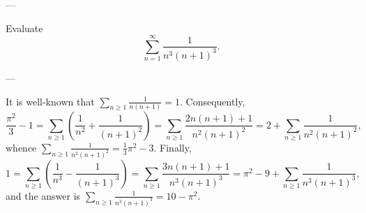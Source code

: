 
---

Evaluate \[\sum_{n=1}^\infty\frac1{n^3(n+1)^3}.\]

---

It is well-known that $\sum_{n\ge1}\frac1{n(n+1)}=1$. Consequently, \[\frac{\pi^2}3-1=\sum_{n\ge1}\left(\frac1{n^2}+\frac1{(n+1)^2}\right)=\sum_{n\ge1}\frac{2n(n+1)+1}{n^2(n+1)^2}=2+\sum_{n\ge1}\frac1{n^2(n+1)^2},\]
whence $\sum_{n\ge1}\frac1{n^2(n+1)^2}=\frac13\pi^2-3$. Finally, \[1=\sum_{n\ge1}\left(\frac1{n^3}-\frac1{(n+1)^3}\right)=\sum_{n\ge1}\frac{3n(n+1)+1}{n^3(n+1)^3}=\pi^2-9+\sum_{n\ge1}\frac1{n^3(n+1)^3},\]
and the answer is $\sum_{n\ge1}\frac1{n^3(n+1)^3}=10-\pi^2$.

